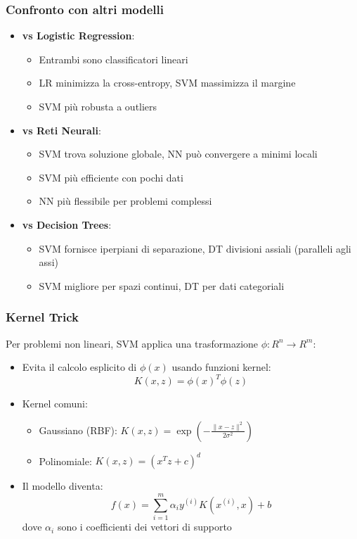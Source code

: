 \documentclass[10pt,oneside,a4paper]{article}
\begin{document}
	\subsubsection{Confronto con altri modelli}
	\begin{itemize}
		\item \textbf{vs Logistic Regression}:
		\begin{itemize}
			\item Entrambi sono classificatori lineari
			\item LR minimizza la cross-entropy, SVM massimizza il margine
			\item SVM più robusta a outliers
		\end{itemize}
		
		\item \textbf{vs Reti Neurali}:
		\begin{itemize}
			\item SVM trova soluzione globale, NN può convergere a minimi locali
			\item SVM più efficiente con pochi dati
			\item NN più flessibile per problemi complessi
		\end{itemize}
		
		\item \textbf{vs Decision Trees}:
		\begin{itemize}
			\item SVM fornisce iperpiani di separazione, DT divisioni assiali (paralleli agli assi)
			\item SVM migliore per spazi continui, DT per dati categoriali
		\end{itemize}
	\end{itemize}
	
	\subsubsection{Kernel Trick}
	Per problemi non lineari, SVM applica una trasformazione $\phi: R^n \rightarrow R^m$:
	\begin{itemize}
		\item Evita il calcolo esplicito di $\phi(x)$ usando funzioni kernel:
		\[
		K(x,z) = \phi(x)^T\phi(z)
		\]
		
		\item Kernel comuni:
		\begin{itemize}
			\item Gaussiano (RBF): $K(x,z) = \exp\left(-\frac{\|x-z\|^2}{2\sigma^2}\right)$
			\item Polinomiale: $K(x,z) = (x^Tz + c)^d$
		\end{itemize}
		
		\item Il modello diventa:
		\[
		f(x) = \sum_{i=1}^m \alpha_i y^{(i)}K(x^{(i)},x) + b
		\]
		dove $\alpha_i$ sono i coefficienti dei vettori di supporto
	\end{itemize}
	
\end{document}
